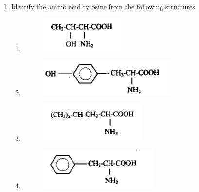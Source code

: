 \documentclass[a4paper,10pt]{article}
\begin{document}
\begin{enumerate}
\item Identify the amino acid tyrosine from the following structures
\hfill{}

\begin{multicols}{2}
\begin{enumerate}
\item \begin{figure}[H]
    \centering
    \includegraphics[width=0.8\columnwidth]{G3opt1.png}
    \caption*{}
    \label{fig:opt1}
\end{figure}
\item \begin{figure}[H]
    \centering
    \includegraphics[width=0.8\columnwidth]{G3opt2.png}
    \caption*{}
    \label{fig:opt2}
\end{figure}
\item \begin{figure}[H]
    \centering
    \includegraphics[width=0.8\columnwidth]{G3opt3.png}
    \caption*{}
    \label{fig:opt3}
\end{figure}
\item \begin{figure}[H]
    \centering
    \includegraphics[width=0.8\columnwidth]{G3opt4.png}
    \caption*{}
    \label{fig:opt4}
\end{figure}
\end{enumerate}
\end{multicols}


\end{enumerate}
\end{document}
